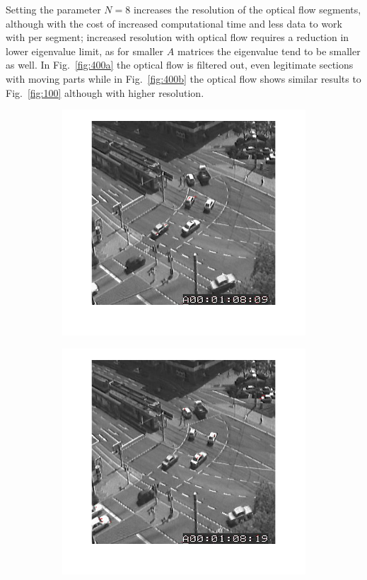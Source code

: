 \documentclass[a4paper]{iacas}
\begin{document}
Setting the parameter $N=8$ increases the resolution of the optical flow segments, although with the cost of increased computational time and less data to work with per segment; increased resolution with optical flow requires a reduction in lower eigenvalue limit, as for smaller $A$ matrices the eigenvalue tend to be smaller as well. In Fig.~\ref{fig:400a} the optical flow is filtered out, even legitimate sections with moving parts while in Fig.~\ref{fig:400b} the optical flow shows similar results to Fig.~\ref{fig:100} although with higher resolution.

\begin{figure}[!htbp]
	\centering
	\begin{subfigure}[b]{0.4\textwidth}
		\includegraphics[width=\textwidth]{402.jpg}
		\caption{}
		\label{fig:402}
	\end{subfigure}
	\begin{subfigure}[b]{0.4\textwidth}
		\includegraphics[width=\textwidth]{403.jpg}

\end{subfigure}
\end{figure}
\end{document}
